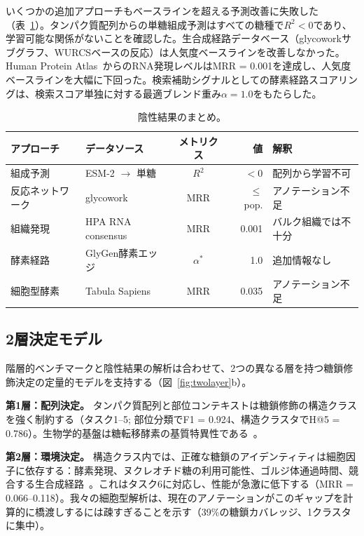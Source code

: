 \documentclass[11pt,a4paper]{ltjsarticle}
\begin{document}
いくつかの追加アプローチもベースラインを超える予測改善に失敗した（表~\ref{tab:negative}）。タンパク質配列からの単糖組成予測はすべての糖種で$R^2 < 0$であり、学習可能な関係がないことを確認した。生合成経路データベース（glycoworkサブグラフ、WURCSベースの反応）は人気度ベースラインを改善しなかった。Human Protein Atlas~\cite{uhlen2015}からのRNA発現レベルはMRR = 0.001を達成し、人気度ベースラインを大幅に下回った。検索補助シグナルとしての酵素経路スコアリングは、検索スコア単独に対する最適ブレンド重み$\alpha = 1.0$をもたらした。

\begin{table}[ht]
\centering
\caption{陰性結果のまとめ。}
\label{tab:negative}
\small
\begin{tabular}{llcrp{3.5cm}}
\toprule
\textbf{アプローチ} & \textbf{データソース} & \textbf{メトリクス} & \textbf{値} & \textbf{解釈} \\
\midrule
組成予測 & ESM-2 $\to$ 単糖 & $R^2$ & $< 0$ & 配列から学習不可 \\
反応ネットワーク & glycowork & MRR & $\leq$ pop. & アノテーション不足 \\
組織発現 & HPA RNA consensus & MRR & 0.001 & バルク組織では不十分 \\
酵素経路 & GlyGen酵素エッジ & $\alpha^*$ & 1.0 & 追加情報なし \\
細胞型酵素 & Tabula Sapiens & MRR & 0.035 & アノテーション不足 \\
\bottomrule
\end{tabular}
\end{table}

\subsection{2層決定モデル}

階層的ベンチマークと陰性結果の解析は合わせて、2つの異なる層を持つ糖鎖修飾決定の定量的モデルを支持する（図~\ref{fig:twolayer}b）。

\textbf{第1層：配列決定。}
タンパク質配列と部位コンテキストは糖鎖修飾の構造クラスを強く制約する（タスク1--5; 部位分類でF1 = 0.924、構造クラスタでH@5 = 0.786）。生物学的基盤は糖転移酵素の基質特異性である~\cite{schjoldager2020,narimatsu2019}。

\textbf{第2層：環境決定。}
構造クラス内では、正確な糖鎖のアイデンティティは細胞因子に依存する：酵素発現、ヌクレオチド糖の利用可能性、ゴルジ体通過時間、競合する生合成経路~\cite{stanley2022,varki2022essentials}。これはタスク6に対応し、性能が急激に低下する（MRR = 0.066--0.118）。我々の細胞型解析は、現在のアノテーションがこのギャップを計算的に橋渡しするには疎すぎることを示す（39\%の糖鎖カバレッジ、1クラスタに集中）。
\end{document}
